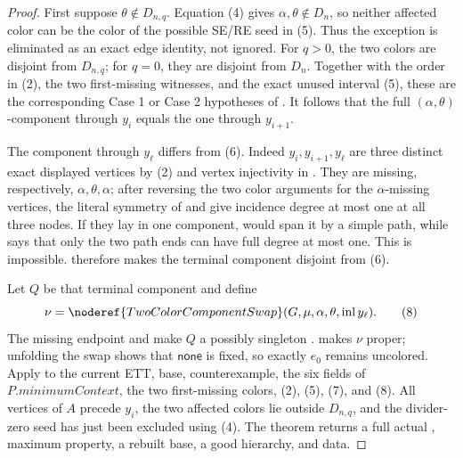 \begin{proof}
First suppose \(\theta\notin D_{n,q}\).  Equation (4) gives
\(\alpha,\theta\notin D_n\), so neither affected color can be the color
of the possible SE/RE seed in (5).  Thus the exception is eliminated as
an exact edge identity, not ignored.  For \(q>0\), the two colors are
disjoint from \(D_{n,q}\); for \(q=0\), they are disjoint from \(D_n\).
Together with the order in (2), the two first-missing witnesses, and the
exact unused interval (5), these are the corresponding Case 1 or Case 2
hypotheses of .  It follows that the full
\((\alpha,\theta)\)-component through \(y_i\) equals the one through
\(y_{i+1}\).                                                        \(\tag{6}\)

The component through \(y_\ell\) differs from (6).  Indeed
\(y_i,y_{i+1},y_\ell\) are three distinct exact displayed vertices by
(2) and vertex injectivity in .  They are missing,
respectively, \(\alpha,\theta,\alpha\); after reversing the two color
arguments for the \(\alpha\)-missing vertices, the literal symmetry of
 and
 give incidence degree at most one
at all three nodes.  If they lay in one component,
 would span it by a simple path,
while  says that only the two
path ends can have full degree at most one.  This is impossible.
 therefore makes the terminal
component disjoint from (6).                                         \(\tag{7}\)

Let \(Q\) be that terminal component and define
\[
 \nu=\noderef{TwoColorComponentSwap}
       (G,\mu,\alpha,\theta,\operatorname{inl}y_\ell).         \tag{8}
\]
The missing endpoint and  make
\(Q\) a possibly singleton .
 makes \(\nu\) proper; unfolding the
swap shows that \(\mathsf{none}\) is fixed, so exactly \(e_0\) remains
uncolored.  Apply  to the current ETT,
base, counterexample, the six fields of
\(P.\mathit{minimumContext}\), the two first-missing colors, (2), (5),
(7), and (8).  All vertices of \(A\) precede \(y_i\), the two affected
colors lie outside \(D_{n,q}\), and the divider-zero seed has just been
excluded using (4).  The theorem returns a full actual
, maximum property, a rebuilt
base, a good hierarchy, and  data.


\end{proof}
